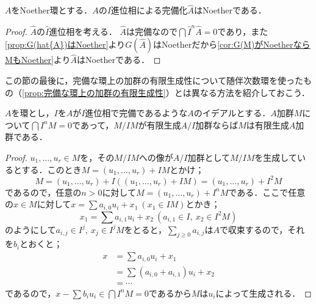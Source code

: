 \begin{thm}
	$A$をNoether環とする．$A$の$I$進位相による完備化$\widehat{A}$はNoetherである．
\end{thm}

\begin{proof}
	$\widehat{A}$の$\widehat{I}$進位相を考える．	$\widehat{A}$は完備なので$\bigcap \widehat{I}^n\widehat{A}=0$であり，また\ref{prop:G(hat{A})はNoether}より$G(\widehat{A})$はNoetherだから\ref{cor:G(M)がNoetherならMもNoether}より$\widehat{A}$はNoetherである．
\end{proof}

この節の最後に，完備な環上の加群の有限生成性について随伴次数環を使ったもの（\ref{prop:完備な環上の加群の有限生成性}）とは異なる方法を紹介しておこう．

\begin{prop}\label{prop:完備な環上の加群の有限生成性without随伴次数環}
	$A$を環とし，$I$を$A$が$I$進位相で完備であるような$A$のイデアルとする．$A$加群$M$について$\bigcap I^n M=0$であって，$M/IM$が有限生成$A/I$加群ならば$M$は有限生成$A$加群である．
\end{prop}

\begin{proof}
	$u_1,\dots,u_r\in M$を，その$M/IM$への像が$A/I$加群として$M/IM$を生成しているとする．このとき$M=(u_1,\dots,u_r)+IM$とかけ；
	\[M=(u_1,\dots,u_r)+I((u_1,\dots, u_r)+IM)=(u_1,\dots,u_r)+I^2M\]
	であるので，任意の$n>0$に対して$M=(u_1,\dots,u_r)+I^nM$である．ここで任意の$x\in M$に対して$x=\sum a_{i,0}u_i+x_1~(x_1\in IM)$とかき；
	\[x_1=\sum a_{i,1}u_i+x_2~(a_{i,1}\in I,~x_2\in I^2M)\]
	のようにして$a_{i,j}\in I^j,~x_j\in I^jM$をとると，$\sum_{j\geq 0} a_{i,j}$は$A$で収束するので，それを$b_i$とおくと；
	\[\begin{aligned}
		x&=\sum a_{i,0}u_i+x_1\\
		&=\sum (a_{i,0}+a_{i,1})u_i+x_2\\
		&=\cdots
	\end{aligned}\]
	であるので，$x-\sum b_iu_i\in\bigcap I^n M=0$であるから$M$は$u_i$によって生成される．
\end{proof}